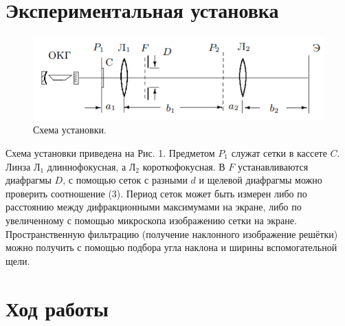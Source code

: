 \documentclass[a4paper,12pt]{article} %
\begin{document}
\section{Экспериментальная установка}
\begin{figure}[h]
\includegraphics[scale=0.7]{1.png}
\centering
\caption{Схема установки.}
\end{figure}
Схема установки приведена на Рис. 1. Предметом $P_1$ служат сетки в кассете $C$. Линза $\text{Л}_1$ длиннофокусная, а $\text{Л}_2$ короткофокусная. В $F$ устанавливаются диафрагмы $D$, с помощью сеток с разными $d$ и щелевой диафрагмы можно проверить соотношение (3). Период сеток может быть измерен либо по расстоянию между дифракционными максимумами на экране, либо по увеличенному с помощью микроскопа изображению сетки на экране. Пространственную фильтрацию (получение наклонного изображение решётки) можно получить с помощью подбора угла наклона и ширины вспомогательной щели.
\newpage
\section{Ход работы}
\end{document}
